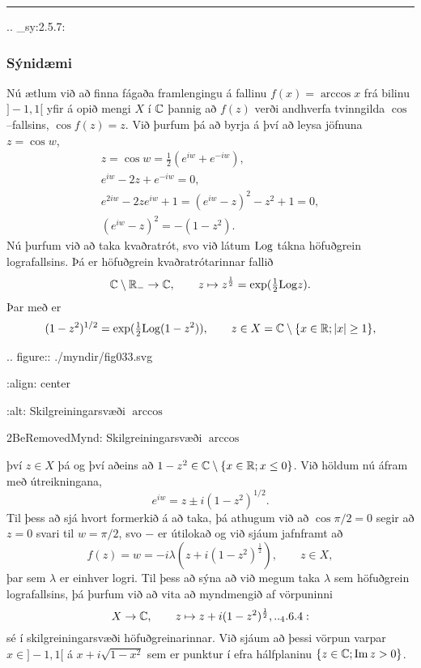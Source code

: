 \bigskip\hrule\bigskip


.. _sy:2.5.7:

\subsubsection{Sýnidæmi}
Nú ætlum við að finna fágaða framlengingu á fallinu
 $f(x)=\arccos x$ frá bilinu $]-1,1[$ yfir á
opið mengi $X$ í ${\mathbb C}$  þannig að $f(z)$ verði andhverfa
tvinngilda $\cos$--fallsins, $\cos f(z)=z$.  
Við þurfum þá að byrja á því að leysa jöfnuna
$z=\cos w$,
\begin{gather*}
z=\cos w =\frac 12(e^{iw}+e^{-iw}),\\
e^{iw}-2z+e^{-iw}=0, \\
e^{2iw}-2ze^{iw}+1=(e^{iw}-z)^2-z^2+1=0,\\
(e^{iw}-z)^2=-(1-z^2).
\end{gather*}
Nú þurfum við að taka kvaðratrót, svo við látum ${\operatorname{Log}}$ tákna
höfuðgrein lografallsins.  Þá er höfuðgrein kvaðratrótarinnar
fallið 
 $${\mathbb C}\setminus{\mathbb R}_- \to {\mathbb C}, \qquad
z\mapsto z\sp{\frac 12}=\exp(\tfrac 12{\operatorname{Log}} z).
 $$  
Þar með er 
 $$(1-z^2)^{1/2}=\exp(\tfrac 12{\operatorname{Log}}(1-z^2)), \qquad z\in
X={\mathbb C}\setminus\{x\in {\mathbb R}; |x|\geq 1\},
 $$

.. figure:: ./myndir/fig033.svg

    :align: center

    :alt: Skilgreiningarsvæði $\arccos$

    2BeRemovedMynd: Skilgreiningarsvæði $\arccos$


\noindent
því $z\in X$ þá og því aðeins að $1-z\sp 2\in {\mathbb C}\setminus\{x\in {\mathbb R};
x\leq 0\}$.  Við höldum nú áfram með útreikningana,
 $$e^{iw}=z\pm i(1-z^2)^{1/2}.
 $$
Til þess að sjá hvort formerkið á að taka, þá athugum  við að
$\cos {\pi}/2=0$ segir að $z=0$
svari til $w=\pi/2$, svo $-$ er útilokað og við sjáum jafnframt að
 $$f(z) = w=-i\lambda(z+i(1-z^2)^{\frac 12}), 
\qquad z\in X, 
 $$
þar sem $\lambda$ er einhver logri.  Til þess að sýna að við megum taka
${\lambda}$ sem höfuðgrein lografallsins, þá þurfum við að
vita að  myndmengið af vörpuninni
\begin{equation*}
X\to \C, \qquad z\mapsto z+i(1-z^2)^{\frac 12},

.. _4.6.4:

\end{equation*}
sé í skilgreiningarsvæði höfuðgreinarinnar.  Við sjáum að þessi vörpun
varpar $x\in ]-1,1[$ á $x+i\sqrt{1-x^2}$ sem er punktur í efra
hálfplaninu $\{z\in {\mathbb C}; {\operatorname{Im\, }} z>0\}$.  


